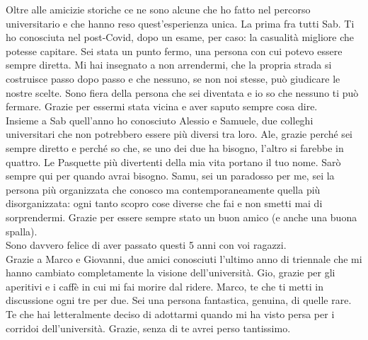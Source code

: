 \begin{acknowledgments}
Oltre alle amicizie storiche ce ne sono alcune che ho fatto nel percorso universitario e che hanno reso quest'esperienza unica. La prima fra tutti Sab. Ti ho conosciuta nel post-Covid, dopo un esame, per caso: la casualità migliore che potesse capitare. Sei stata un punto fermo, una persona con cui potevo essere sempre diretta. Mi hai insegnato a non arrendermi, che la propria strada si costruisce passo dopo passo e che nessuno, se non noi stesse, può giudicare le nostre scelte. Sono fiera della persona che sei diventata e io so che nessuno ti può fermare. Grazie per essermi stata vicina e aver saputo sempre cosa dire. \\
Insieme a Sab quell'anno ho conosciuto Alessio e Samuele, due colleghi universitari che non potrebbero essere più diversi tra loro. Ale, grazie perché sei sempre diretto e perché so che, se uno dei due ha bisogno, l’altro si farebbe in quattro. Le Pasquette più divertenti della mia vita portano il tuo nome. Sarò sempre qui per quando avrai bisogno. Samu, sei un paradosso per me, sei la persona più organizzata che conosco ma contemporaneamente quella più disorganizzata: ogni tanto scopro cose diverse che fai e non smetti mai di sorprendermi. Grazie per essere sempre stato un buon amico (e anche una buona spalla).\\ Sono davvero felice di aver passato questi 5 anni con voi ragazzi. \\

Grazie a Marco e Giovanni, due amici conosciuti l'ultimo anno di triennale che mi hanno cambiato completamente la visione dell'università. Gio, grazie per gli aperitivi e i caffè in cui mi fai morire dal ridere. Marco, te che ti metti in discussione ogni tre per due. Sei una persona fantastica, genuina, di quelle rare. Te che hai letteralmente deciso di adottarmi quando mi ha visto persa per i corridoi dell'università. Grazie, senza di te avrei perso tantissimo. \\


\end{acknowledgments}
